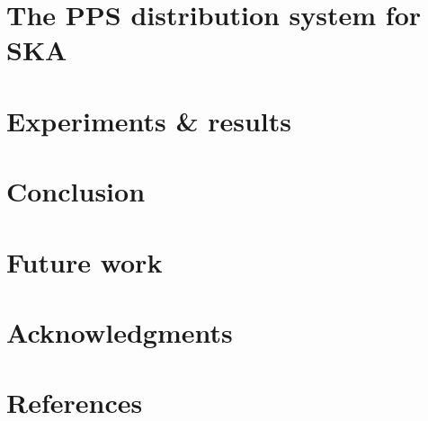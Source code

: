 \documentclass[review]{elsarticle}
\begin{document}


\section{The PPS distribution system for SKA} \label{sec:ska-pps-system}



\section{Experiments \& results} \label{sec:experiments}



\section{Conclusion} \label{sec:conclusion}



\section{Future work} \label{sec:future-work}



\section{Acknowledgments} \label{sec:acknowledgments}



\section*{References}\label{sec:references}


\end{document}
